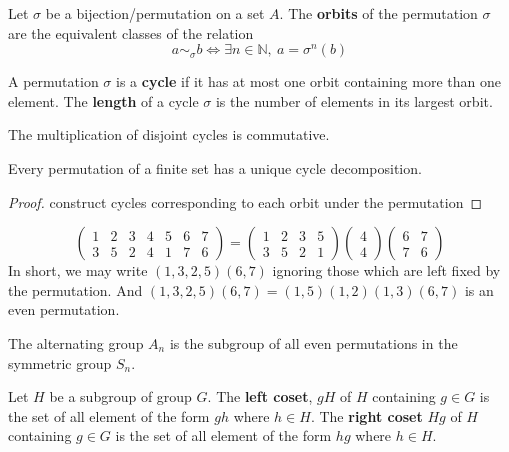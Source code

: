\begin{definition}
	Let $\sigma$ be a bijection/permutation on a set $A$.
	The \textbf{orbits} of the permutation $\sigma$ are the equivalent classes of the relation 
	$$a \sim_\sigma b \iff \exists n \in \mathbb{N},\ a = \sigma^n(b)$$
\end{definition}

\begin{definition}
	A permutation $\sigma$ is a \textbf{cycle} if it has at most one orbit containing more than one element.
	The \textbf{length} of a cycle $\sigma$ is the number of elements in its largest orbit. 
\end{definition}
	The multiplication of disjoint cycles is commutative.

\begin{theorem}
	Every permutation of a finite set has a unique cycle decomposition.
\end{theorem}
\begin{proof}
	construct cycles corresponding to each orbit under the permutation
\end{proof}
$$ \begin{pmatrix} 1 & 2 & 3 & 4 & 5 & 6 & 7 \\ 3 & 5 & 2 & 4 & 1 & 7 & 6 \end{pmatrix} = \begin{pmatrix} 1 & 2 & 3 & 5 \\ 3 & 5 & 2 & 1 \end{pmatrix} \begin{pmatrix}4 \\ 4\end{pmatrix} \begin{pmatrix} 6 & 7 \\ 7 & 6 \end{pmatrix}$$
	In short, we may write $(1,3,2,5)(6,7)$ ignoring those which are left fixed by the permutation.
	And $(1,3,2,5)(6,7) = (1,5)(1,2)(1,3)(6,7)$ is an even permutation.	

\begin{definition}
	The alternating group $A_n$ is the subgroup of all even permutations in the symmetric group $S_n$.
\end{definition}

\begin{definition}
	Let $H$ be a subgroup of group $G$.
	The \textbf{left coset}, $gH$ of $H$ containing $g \in G$ is the set of all element of the form $gh$ where $h \in H$.
	The \textbf{right coset} $Hg$ of $H$ containing $g \in G$ is the set of all element of the form $hg$ where $h \in H$.
\end{definition}

